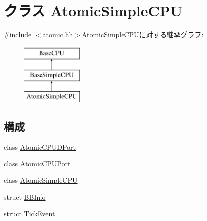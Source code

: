\hypertarget{classAtomicSimpleCPU}{
\section{クラス AtomicSimpleCPU}
\label{classAtomicSimpleCPU}
}


{\ttfamily \#include $<$atomic.hh$>$}AtomicSimpleCPUに対する継承グラフ:\begin{figure}[H]
\begin{center}
\leavevmode
\includegraphics[height=3cm]{classAtomicSimpleCPU}
\end{center}
\end{figure}
\subsection*{構成}
\begin{DoxyCompactItemize}
\item 
class \hyperlink{classAtomicSimpleCPU_1_1AtomicCPUDPort}{AtomicCPUDPort}
\item 
class \hyperlink{classAtomicSimpleCPU_1_1AtomicCPUPort}{AtomicCPUPort}
\item 
class \hyperlink{classAtomicSimpleCPU_1_1AtomicSimpleCPU}{AtomicSimpleCPU}
\item 
struct \hyperlink{structAtomicSimpleCPU_1_1BBInfo}{BBInfo}
\item 
struct \hyperlink{structAtomicSimpleCPU_1_1TickEvent}{TickEvent}
\end{DoxyCompactItemize}
